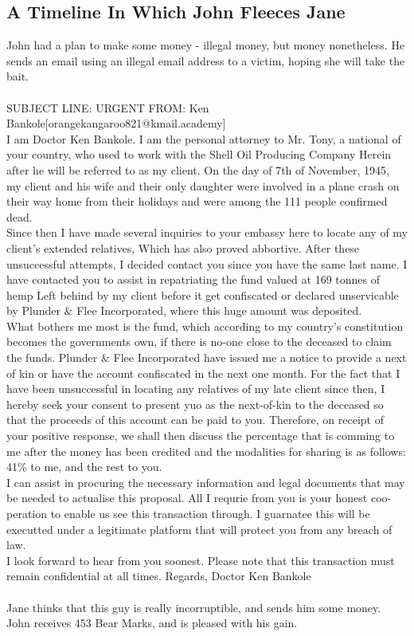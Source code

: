 \documentclass{article}
\begin{document}
\subsection{A Timeline In Which John Fleeces Jane}


John had a plan to make some money {-} illegal money, but money nonetheless.
He sends an email using an illegal email address to a victim, hoping she will take the bait.
\\\\
SUBJECT LINE: URGENT
FROM: Ken Bankole[orangekangaroo821@kmail.academy]
\\
I am Doctor Ken Bankole.
I am the personal attorney to Mr. Tony, a national of your country, who used to work with the Shell Oil Producing Company
Herein after he will be referred to as my client.
On the day of 7th of November, 1945, my client and his wife and their only daughter were involved in a plane crash on their way home from their holidays and were among the 111 people confirmed dead.
\\
Since then I have made several inquiries to your embassy here to locate any of my client's extended relatives, Which has also proved abbortive.
After these unsuccessful attempts, I decided contact you since you have the same last name.
I have contacted you to assist in repatriating the fund valued at 169 tonnes of hemp Left behind by my client before it get confiscated or declared unservicable by Plunder \& Flee Incorporated, where this huge amount was deposited.
\\
What bothers me most is the fund, which according to my country's constitution becomes the governments own, if there is no{-}one close to the deceased to claim the funds.
Plunder \& Flee Incorporated have issued me a notice to provide a next of kin or have the account confiscated in the next one month.
For the fact that I have been unsuccessful in locating any relatives of my late client since then, I hereby seek your consent to present yuo as the next{-}of{-}kin to the deceased so that the proceeds of this account can be paid to you.
Therefore, on receipt of your positive response, we shall then discuss the percentage that is comming to me after the money has been credited and the modalities for sharing is as follows: 41\% to me, and the rest to you.
\\
I can assist in procuring the necessary information and legal documents that may be needed to actualise this proposal.
All I requrie from you is your honest coo{-}peration to enable us see this transaction through.
I guarnatee this will be executted under a legitimate platform that will protect you from any breach of law.
\\
I look forward to hear from you soonest.
Please note that this transaction must remain confidential at all times.
Regards, Doctor Ken Bankole
\\\\
Jane thinks that this guy is really incorruptible, and sends him some money.
John receives 453 Bear Marks, and is pleased with his gain.
\end{document}

